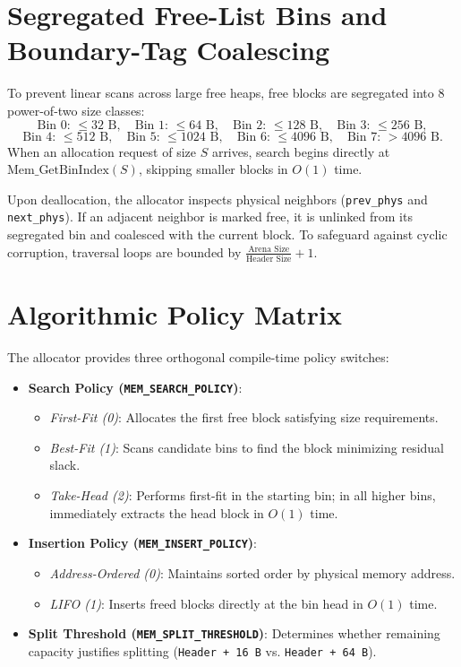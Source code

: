 \documentclass[a4paper,11pt]{report}
\begin{document}
\section{Segregated Free-List Bins and Boundary-Tag Coalescing}
To prevent linear scans across large free heaps, free blocks are segregated into 8 power-of-two size classes:
\begin{equation}
\text{Bin 0: } \le 32\text{ B}, \quad \text{Bin 1: } \le 64\text{ B}, \quad \text{Bin 2: } \le 128\text{ B}, \quad \text{Bin 3: } \le 256\text{ B},
\end{equation}
\begin{equation}
\text{Bin 4: } \le 512\text{ B}, \quad \text{Bin 5: } \le 1024\text{ B}, \quad \text{Bin 6: } \le 4096\text{ B}, \quad \text{Bin 7: } > 4096\text{ B}.
\end{equation}
When an allocation request of size $S$ arrives, search begins directly at $\text{Mem\_GetBinIndex}(S)$, skipping smaller blocks in $O(1)$ time. 

Upon deallocation, the allocator inspects physical neighbors (\texttt{prev\_phys} and \texttt{next\_phys}). If an adjacent neighbor is marked free, it is unlinked from its segregated bin and coalesced with the current block. To safeguard against cyclic corruption, traversal loops are bounded by $\frac{\text{Arena Size}}{\text{Header Size}} + 1$.

\section{Algorithmic Policy Matrix}
The allocator provides three orthogonal compile-time policy switches:
\begin{itemize}
    \item \textbf{Search Policy (\texttt{MEM\_SEARCH\_POLICY})}: 
    \begin{itemize}
        \item \textit{First-Fit (0)}: Allocates the first free block satisfying size requirements.
        \item \textit{Best-Fit (1)}: Scans candidate bins to find the block minimizing residual slack.
        \item \textit{Take-Head (2)}: Performs first-fit in the starting bin; in all higher bins, immediately extracts the head block in $O(1)$ time.
    \end{itemize}
    \item \textbf{Insertion Policy (\texttt{MEM\_INSERT\_POLICY})}:
    \begin{itemize}
        \item \textit{Address-Ordered (0)}: Maintains sorted order by physical memory address.
        \item \textit{LIFO (1)}: Inserts freed blocks directly at the bin head in $O(1)$ time.
    \end{itemize}
    \item \textbf{Split Threshold (\texttt{MEM\_SPLIT\_THRESHOLD})}: Determines whether remaining capacity justifies splitting (\texttt{Header + 16~B} vs. \texttt{Header + 64~B}).
\end{itemize}
\end{document}
